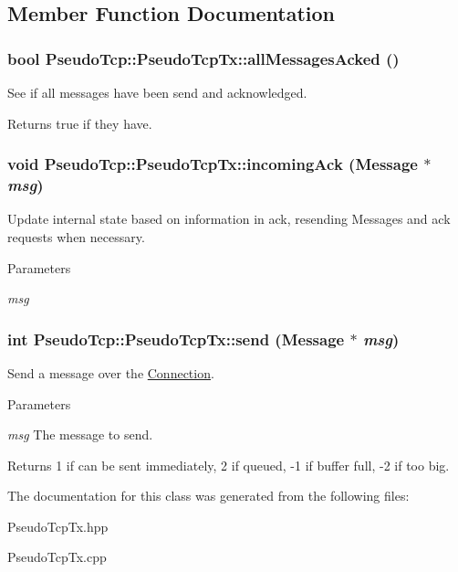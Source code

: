 \subsection{Member Function Documentation}
\hypertarget{classPseudoTcp_1_1PseudoTcpTx_a0285cf3faab1f34b97360bc9f4e68a77}{
\subsubsection[{allMessagesAcked}]{\setlength{\rightskip}{0pt plus 5cm}bool PseudoTcp::PseudoTcpTx::allMessagesAcked ()}}
\label{classPseudoTcp_1_1PseudoTcpTx_a0285cf3faab1f34b97360bc9f4e68a77}
See if all messages have been send and acknowledged. \begin{DoxyReturn}{Returns}
true if they have. 
\end{DoxyReturn}
\hypertarget{classPseudoTcp_1_1PseudoTcpTx_ab947a8457582a5647828bddaebca86a9}{
\subsubsection[{incomingAck}]{\setlength{\rightskip}{0pt plus 5cm}void PseudoTcp::PseudoTcpTx::incomingAck ({\bf Message} $\ast$ {\em msg})}}
\label{classPseudoTcp_1_1PseudoTcpTx_ab947a8457582a5647828bddaebca86a9}
Update internal state based on information in ack, resending Messages and ack requests when necessary. 
\begin{DoxyParams}{Parameters}
\item[{\em msg}]\end{DoxyParams}
\hypertarget{classPseudoTcp_1_1PseudoTcpTx_a647b783fb072921aa4451ee887644e34}{
\subsubsection[{send}]{\setlength{\rightskip}{0pt plus 5cm}int PseudoTcp::PseudoTcpTx::send ({\bf Message} $\ast$ {\em msg})}}
\label{classPseudoTcp_1_1PseudoTcpTx_a647b783fb072921aa4451ee887644e34}
Send a message over the \hyperlink{classPseudoTcp_1_1Connection}{Connection}. 
\begin{DoxyParams}{Parameters}
\item[{\em msg}]The message to send. \end{DoxyParams}
\begin{DoxyReturn}{Returns}
1 if can be sent immediately, 2 if queued, -\/1 if buffer full, -\/2 if too big. 
\end{DoxyReturn}


The documentation for this class was generated from the following files:\begin{DoxyCompactItemize}
\item 
PseudoTcpTx.hpp\item 
PseudoTcpTx.cpp\end{DoxyCompactItemize}

